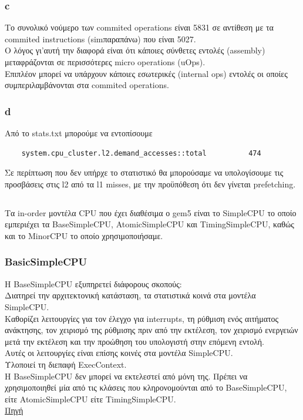 \documentclass{article}
\begin{document}
\subsubsection{c}
Το συνολικό νούμερο των commited operations είναι 5831 σε αντίθεση με τα commited instructions (sim\inst παραπάνω) που είναι 5027. \\
Ο λόγος γι'αυτή την διαφορά είναι ότι κάποιες σύνθετες εντολές (assembly) μεταφράζονται σε περισσότερες micro operations (uOps). \\
Επιπλέον μπορεί να υπάρχουν κάποιες εσωτερικές (internal ops) εντολές οι οποίες συμπεριλαμβάνονται στα commited operations.\\

\subsubsection{d}
Από το stats.txt μπορούμε να εντοπίσουμε
\begin{lstlisting}
    system.cpu_cluster.l2.demand_accesses::total          474
\end{lstlisting}
Σε περίπτωση που δεν υπήρχε το στατιστικό θα μπορούσαμε να υπολογίσουμε τις προσβάσεις στις l2 από τα l1 misses, με την προϋπόθεση ότι δεν γίνεται prefetching.

\subsection{}
Τα in-order μοντέλα CPU που έχει διαθέσιμα ο gem5 είναι το SimpleCPU το οποίο εμπεριέχει τα BaseSimpleCPU, AtomicSimpleCPU και TimingSimpleCPU, καθώς και το MinorCPU το οποίο χρησιμοποιήσαμε. \\
\subsubsection{BasicSimpleCPU}
Η BaseSimpleCPU εξυπηρετεί διάφορους σκοπούς: \\
Διατηρεί την αρχιτεκτονική κατάσταση, τα στατιστικά κοινά στα μοντέλα SimpleCPU. \\
Καθορίζει λειτουργίες για τον έλεγχο για interrupts, τη ρύθμιση ενός αιτήματος ανάκτησης, τον χειρισμό της ρύθμισης πριν από την εκτέλεση, τον χειρισμό ενεργειών μετά την εκτέλεση και την προώθηση του υπολογιστή στην επόμενη εντολή. \\
Αυτές οι λειτουργίες είναι επίσης κοινές στα μοντέλα SimpleCPU. \\
Υλοποιεί τη διεπαφή ExecContext. \\
Η BaseSimpleCPU δεν μπορεί να εκτελεστεί από μόνη της. Πρέπει να χρησιμοποιηθεί μία από τις κλάσεις που κληρονομούνται από το BaseSimpleCPU, είτε AtomicSimpleCPU είτε TimingSimpleCPU. \\
\href{https://www.gem5.org/documentation/general_docs/cpu_models/SimpleCPU#basesimplecpu}{Πηγή}
\end{document}
